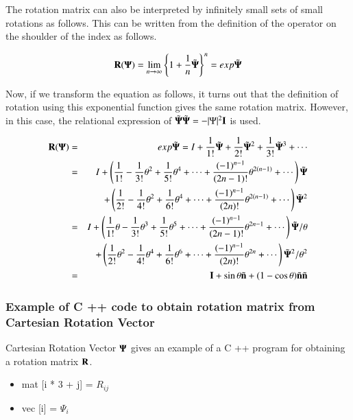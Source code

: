 The rotation matrix can also be interpreted by infinitely small sets of small rotations as follows. This can be written from the definition of the operator on the shoulder of the index as follows.

\begin{equation}
\mathbf{R}(\mathbf{\Psi}) = \lim_{n\rightarrow\infty}\left\{1+\frac{1}{n}\tilde{\mathbf{\Psi}}\right\}^n =exp{\tilde{\mathbf{\Psi}}}
\end{equation}

Now, if we transform the equation as follows, it turns out that the definition of rotation using this exponential function gives the same rotation matrix. However, in this case, the relational expression of $\tilde{\mathbf{\Psi}}\tilde{\mathbf{\Psi}}=-|\Psi|^2\mathbf{I}$ is used.

\begin{eqnarray}
\mathbf{R}(\mathbf{\Psi})
&=&
exp{\tilde{\mathbf{\Psi}}}=I+\frac{1}{1!}\tilde{\mathbf{\Psi}}+\frac{1}{2!}\tilde{\mathbf{\Psi}}^2+\frac{1}{3!}\tilde{\mathbf{\Psi}}^3+\cdots\\
&=&
I + \left(\frac{1}{1!}-\frac{1}{3!}\theta^2+\frac{1}{5!}\theta^4+\cdots+\frac{(-1)^{n-1}}{(2n-1)!}\theta^{2(n-1)}+\cdots\right)\tilde{\mathbf{\Psi}}\\
&&+\left(\frac{1}{2!}-\frac{1}{4!}\theta^2+\frac{1}{6!}\theta^4+\cdots+\frac{(-1)^{n-1}}{(2n)!}\theta^{2(n-1)}+\cdots\right)\tilde{\mathbf{\Psi}}^2\\
&=& I + \left(\frac{1}{1!}\theta-\frac{1}{3!}\theta^3+\frac{1}{5!}\theta^5+\cdots+\frac{(-1)^{n-1}}{(2n-1)!}\theta^{2n-1}+\cdots\right)\tilde{\mathbf{\Psi}}/\theta\\
&&+\left(\frac{1}{2!}\theta^2-\frac{1}{4!}\theta^4+\frac{1}{6!}\theta^6+\cdots+\frac{(-1)^{n-1}}{(2n)!}\theta^{2n}+\cdots\right)\tilde{\mathbf{\Psi}}^2/\theta^2\\
&=& \mathbf{I} + \sin\theta\tilde{\mathbf{n}} + (1-\cos\theta)\tilde{\mathbf{n}}\tilde{\mathbf{n}}
\end{eqnarray}





\subsubsection{Example of C ++ code to obtain rotation matrix from Cartesian Rotation Vector}

Cartesian Rotation Vector $\mathbf{\Psi}$ gives an example of a C ++ program for obtaining a rotation matrix $\mathbf{R}$.

\begin{itemize}
\item mat [i * 3 + j] = $R_{ij}$
\item vec [i] = $\Psi_i$
\end{itemize}


